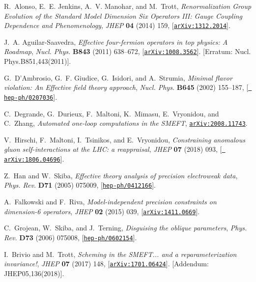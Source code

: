 \documentclass[11pt,a4paper]{article}
\numberwithin{equation}{section}
\numberwithin{figure}{section}
\numberwithin{table}{section}
\begin{document}
\begin{thebibliography}{100}
R.~Alonso, E.~E. Jenkins, A.~V. Manohar, and M.~Trott, {\it {Renormalization
  Group Evolution of the Standard Model Dimension Six Operators III: Gauge
  Coupling Dependence and Phenomenology}},  {\em JHEP} {\bf 04} (2014) 159,
  [\href{http://arxiv.org/abs/1312.2014}{{\tt arXiv:1312.2014}}].

J.~A. Aguilar-Saavedra, {\it {Effective four-fermion operators in top physics:
  A Roadmap}},  {\em Nucl. Phys.} {\bf B843} (2011) 638--672,
  [\href{http://arxiv.org/abs/1008.3562}{{\tt arXiv:1008.3562}}]. [Erratum:
  Nucl. Phys.B851,443(2011)].

G.~D'Ambrosio, G.~F. Giudice, G.~Isidori, and A.~Strumia, {\it {Minimal flavor
  violation: An Effective field theory approach}},  {\em Nucl. Phys.} {\bf
  B645} (2002) 155--187, [\href{http://arxiv.org/abs/hep-ph/0207036}{{\tt
  hep-ph/0207036}}].

C.~Degrande, G.~Durieux, F.~Maltoni, K.~Mimasu, E.~Vryonidou, and C.~Zhang,
  {\it {Automated one-loop computations in the SMEFT}},
  \href{http://arxiv.org/abs/2008.11743}{{\tt arXiv:2008.11743}}.

V.~Hirschi, F.~Maltoni, I.~Tsinikos, and E.~Vryonidou, {\it {Constraining
  anomalous gluon self-interactions at the LHC: a reappraisal}},  {\em JHEP}
  {\bf 07} (2018) 093, [\href{http://arxiv.org/abs/1806.04696}{{\tt
  arXiv:1806.04696}}].

Z.~Han and W.~Skiba, {\it {Effective theory analysis of precision electroweak
  data}},  {\em Phys. Rev.} {\bf D71} (2005) 075009,
  [\href{http://arxiv.org/abs/hep-ph/0412166}{{\tt hep-ph/0412166}}].

A.~Falkowski and F.~Riva, {\it {Model-independent precision constraints on
  dimension-6 operators}},  {\em JHEP} {\bf 02} (2015) 039,
  [\href{http://arxiv.org/abs/1411.0669}{{\tt arXiv:1411.0669}}].

C.~Grojean, W.~Skiba, and J.~Terning, {\it {Disguising the oblique
  parameters}},  {\em Phys. Rev.} {\bf D73} (2006) 075008,
  [\href{http://arxiv.org/abs/hep-ph/0602154}{{\tt hep-ph/0602154}}].

I.~Brivio and M.~Trott, {\it {Scheming in the SMEFT... and a reparameterization
  invariance!}},  {\em JHEP} {\bf 07} (2017) 148,
  [\href{http://arxiv.org/abs/1701.06424}{{\tt arXiv:1701.06424}}]. [Addendum:
  JHEP05,136(2018)].


\end{thebibliography}
\end{document}
